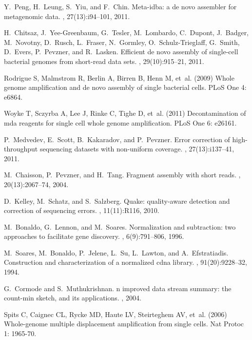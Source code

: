 \documentclass{pnastwo}
\begin{document}
\begin{article}
\begin{thebibliography}{20}
Y.~Peng, H.~Leung, S.~Yiu, and F.~Chin.
\newblock Meta-idba: a de novo assembler for metagenomic data.
, 27(13):i94--101, 2011.

H.~Chitsaz, J.~Yee-Greenbaum, G.~Tesler, M.~Lombardo, C.~Dupont, J.~Badger,
  M.~Novotny, D.~Rusch, L.~Fraser, N.~Gormley, O.~Schulz-Trieglaff, G.~Smith,
  D.~Evers, P.~Pevzner, and R.~Lasken.
\newblock Efficient de novo assembly of single-cell bacterial genomes from
  short-read data sets.
, 29(10):915--21, 2011.

Rodrigue S, Malmstrom R, Berlin A, Birren B, Henn M, et~al. (2009) Whole genome
  amplification and de novo assembly of single bacterial cells.
\newblock PLoS One 4: e6864.

Woyke T, Sczyrba A, Lee J, Rinke C, Tighe D, et~al. (2011) Decontamination of
  mda reagents for single cell whole genome amplification.
\newblock PLoS One 6: e26161.

P.~Medvedev, E.~Scott, B.~Kakaradov, and P.~Pevzner.
\newblock Error correction of high-throughput sequencing datasets with
  non-uniform coverage.
, 27(13):i137--41, 2011.

M.~Chaisson, P.~Pevzner, and H.~Tang.
\newblock Fragment assembly with short reads.
, 20(13):2067--74, 2004.

D.~Kelley, M.~Schatz, and S.~Salzberg.
\newblock Quake: quality-aware detection and correction of sequencing errors.
, 11(11):R116, 2010.

M.~Bonaldo, G.~Lennon, and M.~Soares.
\newblock Normalization and subtraction: two approaches to facilitate gene
  discovery.
, 6(9):791--806, 1996.

M.~Soares, M.~Bonaldo, P.~Jelene, L.~Su, L.~Lawton, and A.~Efstratiadis.
\newblock Construction and characterization of a normalized cdna library.
, 91(20):9228--32, 1994.

G.~Cormode and S.~Muthukrishnan.
n improved data stream summary: the count-min sketch, and its
  applications.
, 2004.

Spits C, Caignec CL, Rycke MD, Haute LV, Steirteghem AV, et~al. (2006)
  Whole-genome multiple displacement amplification from single cells.
\newblock Nat Protoc 1: 1965-70.


\end{thebibliography}
\end{article}
\end{document}
